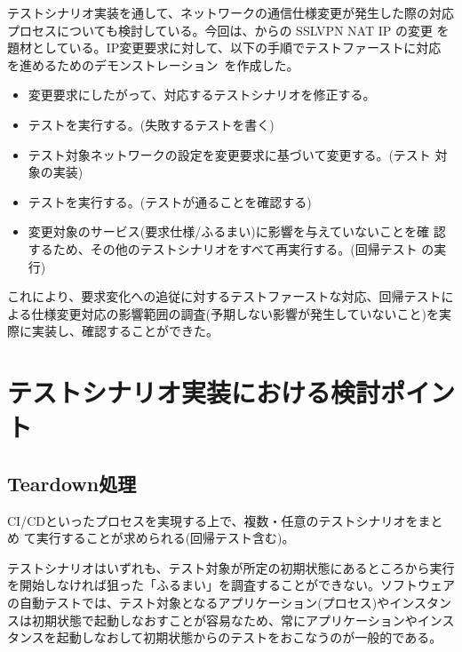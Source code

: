 テストシナリオ実装を通して、ネットワークの通信仕様変更が発生した際の対応
プロセスについても検討している。今回は、\tj からの SSLVPN NAT IP の変更
を題材としている。IP変更要求に対して、以下の手順でテストファーストに対応
を進めるためのデモンストレーション~\cite{nettester-demo-movie}を作成した。
\begin{itemize}
 \item 変更要求にしたがって、対応するテストシナリオを修正する。
 \item テストを実行する。(失敗するテストを書く)
 \item テスト対象ネットワークの設定を変更要求に基づいて変更する。(テスト
       対象の実装)
 \item テストを実行する。(テストが通ることを確認する)
 \item 変更対象のサービス(要求仕様/ふるまい)に影響を与えていないことを確
       認するため、その他のテストシナリオをすべて再実行する。(回帰テスト
       の実行)
\end{itemize}
これにより、要求変化への追従に対するテストファーストな対応、回帰テストに
よる仕様変更対応の影響範囲の調査(予期しない影響が発生していないこと)を実
際に実装し、確認することができた。

 \section{テストシナリオ実装における検討ポイント}
 \label{sec:testscenario-impl-point}

  \subsection{Teardown処理}
  \label{sec:teardown}
CI/CDといったプロセスを実現する上で、複数・任意のテストシナリオをまとめ
て実行することが求められる(回帰テスト含む)。

テストシナリオはいずれも、テスト対象が所定の初期状態にあるところから実行
を開始しなければ狙った「ふるまい」を調査することができない。ソフトウェア
の自動テストでは、テスト対象となるアプリケーション(プロセス)やインスタン
スは初期状態で起動しなおすことが容易なため、常にアプリケーションやインス
タンスを起動しなおして初期状態からのテストをおこなうのが一般的である。

